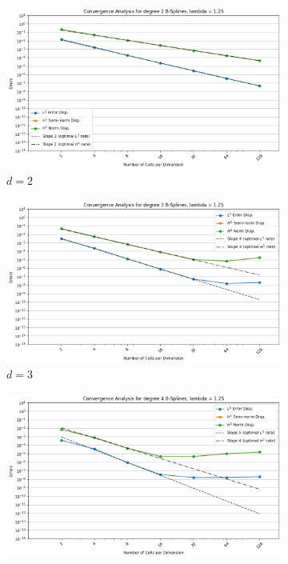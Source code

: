 \documentclass[a4paper,12pt,twoside]{report}
\begin{document}
\begin{figure}[!h]
	\centering
	\begin{subfigure}[b]{0.49\textwidth}
		\centering
		\includegraphics[width=\textwidth]{figures_non_mixed/convergence_plot_degree_2_lambda=1.25.png}
		\caption{$d=2$}
		\label{fig:deg2_NM}
	\end{subfigure}
	\begin{subfigure}[b]{0.49\textwidth}
		\centering
		\includegraphics[width=\textwidth]{figures_non_mixed/convergence_plot_degree_3_lambda=1.25.png}
		\caption{$d=3$}
		\label{fig:deg3_NM}
	\end{subfigure}
	\begin{subfigure}[b]{0.49\textwidth}
		\centering
		\includegraphics[width=\textwidth]{figures_non_mixed/convergence_plot_degree_4_lambda=1.25.png}

\end{subfigure}
\end{figure}
\end{document}
